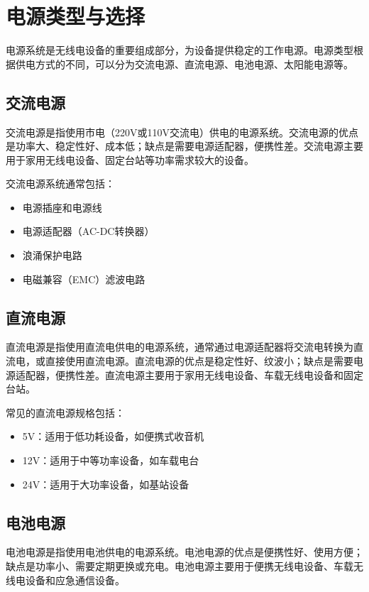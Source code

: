 \documentclass[12pt,UTF8]{ctexbook}
\begin{document}
\section{电源类型与选择}

电源系统是无线电设备的重要组成部分，为设备提供稳定的工作电源。电源类型根据供电方式的不同，可以分为交流电源、直流电源、电池电源、太阳能电源等。

\subsection{交流电源}

交流电源是指使用市电（220V或110V交流电）供电的电源系统。交流电源的优点是功率大、稳定性好、成本低；缺点是需要电源适配器，便携性差。交流电源主要用于家用无线电设备、固定台站等功率需求较大的设备。

交流电源系统通常包括：
\begin{itemize}
    \item 电源插座和电源线
    \item 电源适配器（AC-DC转换器）
    \item 浪涌保护电路
    \item 电磁兼容（EMC）滤波电路
\end{itemize}

\subsection{直流电源}

直流电源是指使用直流电供电的电源系统，通常通过电源适配器将交流电转换为直流电，或直接使用直流电源。直流电源的优点是稳定性好、纹波小；缺点是需要电源适配器，便携性差。直流电源主要用于家用无线电设备、车载无线电设备和固定台站。

常见的直流电源规格包括：
\begin{itemize}
    \item 5V：适用于低功耗设备，如便携式收音机
    \item 12V：适用于中等功率设备，如车载电台
    \item 24V：适用于大功率设备，如基站设备
\end{itemize}

\subsection{电池电源}

电池电源是指使用电池供电的电源系统。电池电源的优点是便携性好、使用方便；缺点是功率小、需要定期更换或充电。电池电源主要用于便携无线电设备、车载无线电设备和应急通信设备。
\end{document}
